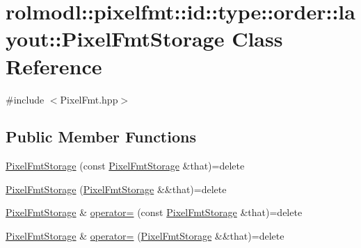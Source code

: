 \hypertarget{classrolmodl_1_1pixelfmt_1_1id_1_1type_1_1order_1_1layout_1_1_pixel_fmt_storage}{}\section{rolmodl\+::pixelfmt\+::id\+::type\+::order\+::layout\+::Pixel\+Fmt\+Storage Class Reference}
\label{classrolmodl_1_1pixelfmt_1_1id_1_1type_1_1order_1_1layout_1_1_pixel_fmt_storage}


{\ttfamily \#include $<$Pixel\+Fmt.\+hpp$>$}

\subsection*{Public Member Functions}
\begin{DoxyCompactItemize}
\item 
\mbox{\hyperlink{classrolmodl_1_1pixelfmt_1_1id_1_1type_1_1order_1_1layout_1_1_pixel_fmt_storage_adc3a76ccaf5a072fc0d17ac6c9f2f285}{Pixel\+Fmt\+Storage}} (const \mbox{\hyperlink{classrolmodl_1_1pixelfmt_1_1id_1_1type_1_1order_1_1layout_1_1_pixel_fmt_storage}{Pixel\+Fmt\+Storage}} \&that)=delete
\item 
\mbox{\hyperlink{classrolmodl_1_1pixelfmt_1_1id_1_1type_1_1order_1_1layout_1_1_pixel_fmt_storage_ad43eb35eb945501b94195d9f3374ba67}{Pixel\+Fmt\+Storage}} (\mbox{\hyperlink{classrolmodl_1_1pixelfmt_1_1id_1_1type_1_1order_1_1layout_1_1_pixel_fmt_storage}{Pixel\+Fmt\+Storage}} \&\&that)=delete
\item 
\mbox{\hyperlink{classrolmodl_1_1pixelfmt_1_1id_1_1type_1_1order_1_1layout_1_1_pixel_fmt_storage}{Pixel\+Fmt\+Storage}} \& \mbox{\hyperlink{classrolmodl_1_1pixelfmt_1_1id_1_1type_1_1order_1_1layout_1_1_pixel_fmt_storage_a6a6d578a602432fb20ca332793eac2f8}{operator=}} (const \mbox{\hyperlink{classrolmodl_1_1pixelfmt_1_1id_1_1type_1_1order_1_1layout_1_1_pixel_fmt_storage}{Pixel\+Fmt\+Storage}} \&that)=delete
\item 
\mbox{\hyperlink{classrolmodl_1_1pixelfmt_1_1id_1_1type_1_1order_1_1layout_1_1_pixel_fmt_storage}{Pixel\+Fmt\+Storage}} \& \mbox{\hyperlink{classrolmodl_1_1pixelfmt_1_1id_1_1type_1_1order_1_1layout_1_1_pixel_fmt_storage_adb4ac4c62b99ac4cac9e320e36336cf7}{operator=}} (\mbox{\hyperlink{classrolmodl_1_1pixelfmt_1_1id_1_1type_1_1order_1_1layout_1_1_pixel_fmt_storage}{Pixel\+Fmt\+Storage}} \&\&that)=delete
\end{DoxyCompactItemize}
